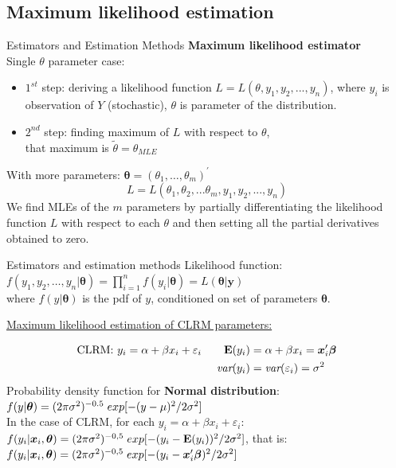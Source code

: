 \documentclass{beamer}
\begin{document}
\subsection{Maximum likelihood estimation}
\begin{frame}{Estimators and Estimation Methods}
\textbf{Maximum likelihood estimator}\\
\medskip
Single $\theta$ parameter case:\\
\begin{itemize}
\item $1^{st}$ step: deriving a likelihood function $L=L(\theta ,y_1, y_2, ... , y_n)$, where $y_i$ is observation of $Y$ (stochastic), $\theta$ is parameter of the distribution.\\
\item $2^{nd}$ step: finding maximum of $L$ with respect to $\theta$, \\that maximum is $\tilde{\theta} = \theta_{MLE}$
\end{itemize}
With more parameters: $\bm{\theta} = (\theta_1, \dots , \theta_m)^{\prime}$
$$L=L(\theta_1, \theta_2, ... \theta_m, y_1, y_2, ... , y_n)$$
We find MLEs of the $m$ parameters by partially differentiating the likelihood function $L$ with respect to each $\theta$ and then setting all the partial derivatives obtained to zero.\\
\end{frame}
\begin{frame}{Estimators and estimation methods}
Likelihood function:\\ 
$f(y_1,y_2,\dots,y_n|\bm{\theta}) = \prod_{i=1}^n f(y_i|\bm{\theta}) = L(\bm{\theta}|\bm{y})$ \\
where $f(y|\bm{\theta})$ is the pdf of $y$, conditioned on set of parameters $\bm{\theta}$.\\
\medskip
\centerline{\underline{Maximum likelihood estimation of CLRM parameters:}}
\begin{align*}
\textnormal{CLRM: } y_i= \alpha + \beta x_i + \varepsilon_i \qquad \mathbf{E}(y_i) & =\alpha +\beta x_i = \bm{x}_i^{\prime}\bm{\beta}\\
\textit{var}(y_i) & =\textit{var}(\varepsilon_i)=\sigma^2
\end{align*}
Probability density function for \textbf{Normal distribution}:\\
\medskip
$f(y|\bm{\theta})=(2\pi\sigma^2)^{-0.5} \hspace{0.1cm} exp[-(y-\mu)^2/2\sigma^2]$\\
\bigskip
In the case of CLRM, for each $y_i=\alpha + \beta x_i + \varepsilon_i$: \\
\medskip
$f(y_i| \bm{x}_i,\bm{\theta})=(2\pi\sigma^2)^{-0,5} \hspace{0.1cm} exp[-(y_i-\mathbf{E}(y_i))^2/2\sigma^2]$, that is:\\
$f(y_i| \bm{x}_i,\bm{\theta})=(2\pi\sigma^2)^{-0,5} \hspace{0.1cm} exp[-(y_i-\bm{x}_i^{\prime}\bm{\beta})^2/2\sigma^2]$

\end{frame}
\end{document}
